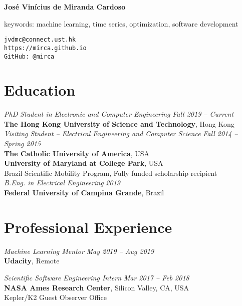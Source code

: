 \documentclass[10pt]{article}
\begin{document}
\pagestyle{empty}
\begin{titlepage}
     {\Large{\textbf{Jos\'e Vin\'icius de Miranda Cardoso}}}
     \vspace{.5cm}

    \begin{minipage}[b]{8cm}
      keywords: machine learning, time series, optimization, software development\\
    \end{minipage}
    \hfill
    \begin{minipage}[b]{4cm}
        \hfill \texttt{jvdmc@connect.ust.hk}\\
        \texttt{https://mirca.github.io}\\
        \texttt{GitHub: @mirca}
    \end{minipage}


\section*{Education}

\emph{PhD Student in Electronic and Computer Engineering} \hfill \textit{Fall 2019 -- Current} \\
\textbf{The Hong Kong University of Science and Technology}, Hong Kong\\

\emph{Visiting Student -- Electrical Engineering and Computer Science} \hfill \textit{Fall 2014 -- Spring 2015} \\
\textbf{The Catholic University of America}, USA\\
\textbf{University of Maryland at College Park}, USA \\
Brazil Scientific Mobility Program, Fully funded scholarship recipient \\

\emph{B.Eng. in Electrical Engineering} \hfill \textit{2019} \\
\textbf{Federal University of Campina Grande}, Brazil

\section*{Professional Experience}
\emph{Machine Learning Mentor} \hfill \textit{May 2019  -- Aug 2019}
\\\textbf{Udacity}, Remote
\vspace{.5cm}

\emph{Scientific Software Engineering Intern} \hfill \textit{Mar 2017 -- Feb 2018}
\\\textbf{NASA Ames Research Center}, Silicon Valley, CA, USA
\\Kepler/K2 Guest Observer Office
\vspace{.5cm}


\end{titlepage}
\end{document}
